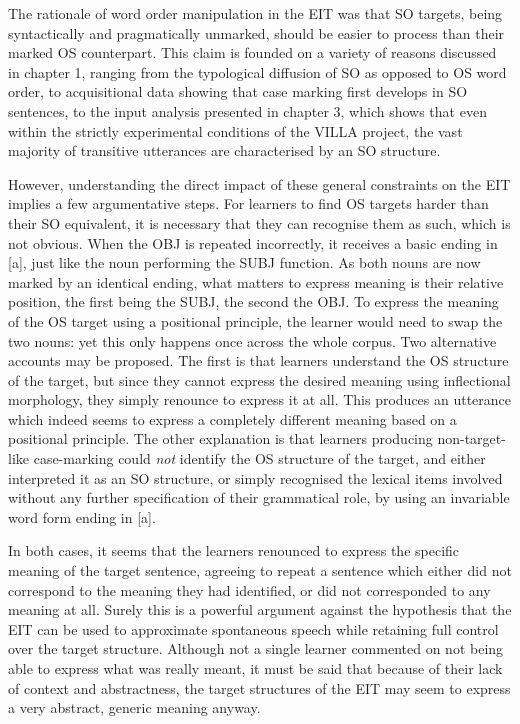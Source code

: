The rationale of word order manipulation in the EIT was that SO targets, being syntactically and pragmatically unmarked, should be easier to process than their marked OS counterpart. This claim is founded on a variety of reasons discussed in chapter 1, ranging from the typological diffusion of SO as opposed to OS word order, to acquisitional data showing that case marking first develops in SO sentences, to the input analysis presented in chapter 3, which shows that even within the strictly experimental conditions of the VILLA project, the vast majority of transitive utterances are characterised by an SO structure. 

However, understanding the direct impact of these general constraints on the EIT implies a few argumentative steps. For learners to find OS targets harder than their SO equivalent, it is necessary that they can recognise them as such, which is not obvious. When the OBJ is repeated incorrectly, it receives a basic ending in [a], just like the noun performing the SUBJ function. As both nouns are now marked by an identical ending, what matters to express meaning is their relative position, the first being the SUBJ, the second the OBJ. To express the meaning of the OS target using a positional principle, the learner would need to swap the two nouns: yet this only happens once across the whole corpus. Two alternative accounts may be proposed. The first is that learners understand the OS structure of the target, but since they cannot express the desired meaning using inflectional morphology, they simply renounce to express it at all. This produces an utterance which indeed seems to express a completely different meaning based on a positional principle. The other explanation is that learners producing non-target-like case-marking could \textit{not} identify the OS structure of the target, and either interpreted it as an SO structure, or simply recognised the lexical items involved without any further specification of their grammatical role, by using an invariable word form ending in [a]. 

In both cases, it seems that the learners renounced to express the specific meaning of the target sentence, agreeing to repeat a sentence which either did not correspond to the meaning they had identified, or did not corresponded to any meaning at all. Surely this is a powerful argument against the hypothesis that the EIT can be used to approximate spontaneous speech while retaining full control over the target structure. Although not a single learner commented on not being able to express what was really meant, it must be said that because of their lack of context and abstractness, the target structures of the EIT may seem to express a very abstract, generic meaning anyway. 

